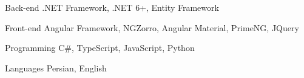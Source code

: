 

\begin{cvskills}

  \cvskill
    {Back-end} %
    {.NET Framework, .NET 6+, Entity Framework} %

  \cvskill
    {Front-end} %
    {Angular Framework, NGZorro, Angular Material, PrimeNG, JQuery} %

  \cvskill
    {Programming} %
    {C\#, TypeScript, JavaScript, Python} %

  \cvskill
    {Languages} %
    {Persian, English} %

\end{cvskills}
